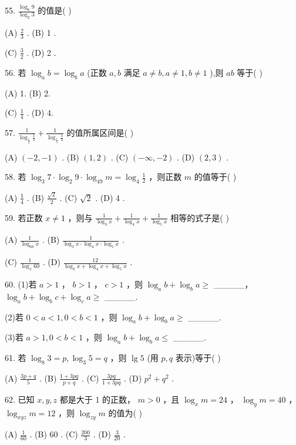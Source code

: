 \documentclass[10pt]{article}
\begin{document}
55. \(\frac{{\log }_{8}9}{{\log }_{2}3}\) 的值是( )

(A) \(\frac{2}{3}\) . (B) 1 .

(C) \(\frac{3}{2}\) . (D) 2 .

56. 若 \({\log }_{a}b = {\log }_{b}a\) (正数 \(a,b\) 满足 \(a \neq  b,a \neq  1,b \neq  1\) ),则 \({ab}\) 等于( )

(A) 1. (B) 2.

(C) \(\frac{1}{4}\) . (D) 4.

57. \(\frac{1}{{\log }_{\frac{1}{2}}\frac{1}{3}} + \frac{1}{{\log }_{\frac{1}{5}}\frac{1}{3}}\) 的值所属区间是( )

(A) \(\left( {-2, - 1}\right)\) . (B) \(\left( {1,2}\right)\) . (C) \(\left( {-\infty , - 2}\right)\) . (D) \(\left( {2,3}\right)\) .

58. 若 \({\log }_{3}7 \cdot  {\log }_{2}9 \cdot  {\log }_{49}m = {\log }_{4}\frac{1}{2}\) ，则正数 \(m\) 的值等于( )

(A) \(\frac{1}{4}\) . (B) \(\frac{\sqrt{2}}{2}\) . (C) \(\sqrt{2}\) . (D) 4 .

59. 若正数 \(x \neq  1\) ，则与 \(\frac{1}{{\log }_{3}x} + \frac{1}{{\log }_{4}x} + \frac{1}{{\log }_{5}x}\) 相等的式子是( )

(A) \(\frac{1}{{\log }_{60}x}\) . (B) \(\frac{1}{{\log }_{3}x \cdot  {\log }_{4}x \cdot  {\log }_{5}x}\) .

(C) \(\frac{1}{{\log }_{x}{60}}\) . (D) \(\frac{12}{{\log }_{3}x + {\log }_{4}x + {\log }_{5}x}\) .

60. (1)若 \(a > 1\) ， \(b > 1\) ， \(c > 1\) ，则 \({\log }_{a}b + {\log }_{b}a \geq\) \_\_\_\_\_， \({\log }_{a}b + {\log }_{b}c + {\log }_{c}a \geq\) \_\_\_\_\_.

(2)若 \(0 < a < 1,0 < b < 1\) ，则 \({\log }_{a}b + {\log }_{b}a \geq\) \_\_\_\_\_.

(3)若 \(a > 1,0 < b < 1\) ，则 \({\log }_{a}b + {\log }_{b}a \leq\) \_\_\_\_\_.

61. 若 \({\log }_{8}3 = p,{\log }_{3}5 = q\) ，则 \(\lg 5\) (用 \(p,q\) 表示)等于( )

(A) \(\frac{{3p} + q}{5}\) . (B) \(\frac{1 + {3pq}}{p + q}\) . (C) \(\frac{3pq}{1 + {3pq}}\) . (D) \({p}^{2} + {q}^{2}\) .

62. 已知 \(x,y,z\) 都是大于 1 的正数， \(m > 0\) ，且 \({\log }_{x}m = {24}\) ， \({\log }_{y}m = {40}\) ， \({\log }_{xyz}m = {12}\) ，则 \({\log }_{zy}m\) 的值为( )

(A) \(\frac{1}{60}\) . (B) 60 . (C) \(\frac{200}{3}\) . (D) \(\frac{3}{20}\) .
\end{document}

